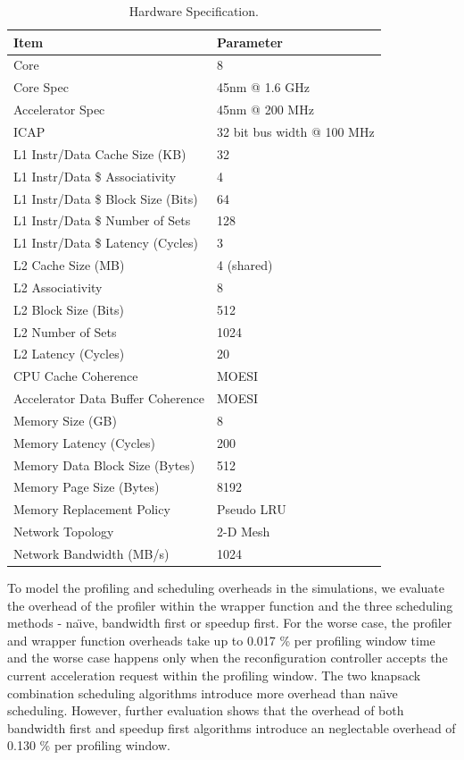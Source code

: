 \begin{table}
\scriptsize
\begin{center}
  \begin{tabular} { | l | l | }
    \hline
    \textbf{Item} & \textbf{Parameter} \\
    \hline
    \hline
	Core & 8 \\
	\hline
	Core Spec & 45nm @ 1.6 GHz \\
	\hline
	Accelerator Spec& 45nm @ 200 MHz \\
	\hline
	ICAP & 32 bit bus width @ 100 MHz \\
	\hline
	L1 Instr/Data Cache Size (KB) & 32 \\
	\hline
    L1 Instr/Data \$ Associativity & 4\\
    \hline
    L1 Instr/Data \$ Block Size (Bits) & 64\\
    \hline
    L1 Instr/Data \$ Number of Sets & 128\\
    \hline
    L1 Instr/Data \$ Latency (Cycles) & 3 \\
   	\hline
   	L2 Cache Size (MB) & 4 (shared) \\
   	\hline
    L2 Associativity & 8\\
    \hline
    L2 Block Size (Bits) & 512\\
    \hline
    L2 Number of Sets & 1024 \\
    \hline
    L2 Latency (Cycles) & 20\\
    \hline
    CPU Cache Coherence & MOESI\\
    \hline 
    Accelerator Data Buffer Coherence & MOESI\\
    \hline
    Memory Size (GB) & 8 \\
    \hline
    Memory Latency (Cycles) & 200 \\
    \hline
    Memory Data Block Size (Bytes) & 512\\
    \hline
    Memory Page Size (Bytes) & 8192\\
    \hline
    Memory Replacement Policy & Pseudo LRU\\
    \hline
    Network Topology & 2-D Mesh\\
    \hline
    Network Bandwidth (MB/s) & 1024\\
    \hline
  \end{tabular}
\caption{Hardware Specification.}
\label{tbl_parameters}
\end{center}
\end{table}


To model the profiling and scheduling overheads in the simulations,
we evaluate the overhead of the profiler within the wrapper function and the
three scheduling methods - na\"{\i}ve, bandwidth first or speedup first. For
the worse case, the profiler and wrapper function overheads take up
to 0.017 \% per profiling window time and the worse case happens only
when the reconfiguration controller accepts the current acceleration
request within the profiling window. The two knapsack combination
scheduling algorithms introduce more overhead than na\"{\i}ve scheduling. However, further evaluation shows that the overhead of both bandwidth
first and speedup first algorithms introduce an neglectable overhead of 0.130 \% per profiling window. 

